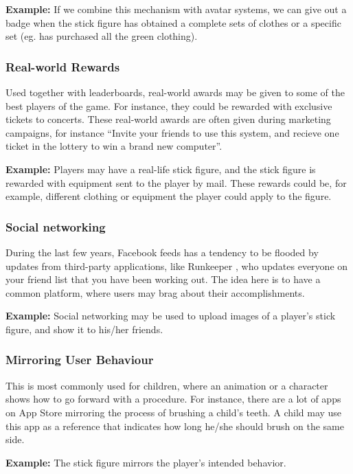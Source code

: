 \textbf{Example:} If we combine this mechanism with avatar systems, we can give out a badge when the stick figure has obtained a complete sets of clothes or a specific set (eg. has purchased all the green clothing).   

\subsubsection{Real-world Rewards}
Used together with leaderboards, real-world awards may be given to some of the best players of the game. For instance, they could be rewarded with exclusive tickets to concerts. These real-world awards are often given during marketing campaigns, for instance ``Invite your friends to use this system, and recieve one ticket in the lottery to win a brand new computer''.  

\textbf{Example:} Players may have a real-life stick figure, and the stick figure is rewarded with equipment sent to the player by mail. These rewards could be, for example, different clothing or equipment the player could apply to the figure. 

\subsubsection{Social networking}
During the last few years, Facebook feeds has a tendency to be flooded by updates from third-party applications, like Runkeeper , who updates everyone on your friend list that you have been working out. The idea here is to have a common platform, where users may brag about their accomplishments.      

\textbf{Example:} Social networking may be used to upload images of a player's stick figure, and show it to his/her friends. 

\subsubsection{Mirroring User Behaviour}
This is most commonly used for children, where an animation or a character shows how to go forward with a procedure. For instance, there are a lot of apps on App Store mirroring the process of brushing a child's teeth. A child may use this app as a reference that indicates how long he/she should brush on the same side.   

\textbf{Example:} The stick figure mirrors the player's intended behavior. 

